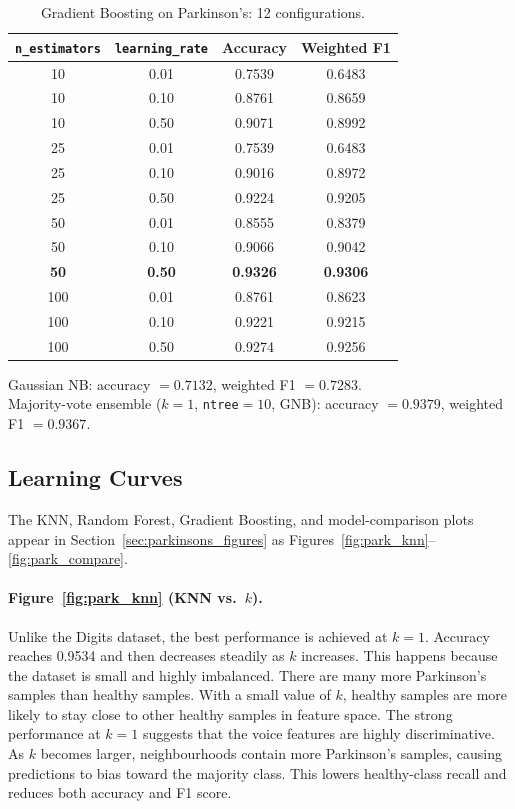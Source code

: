 \documentclass[11pt,letterpaper]{article}
\begin{document}
\begin{table}[H]
\centering
\caption{Gradient Boosting on Parkinson's: 12 configurations.}
\label{tab:d2_gb}
\begin{tabular}{@{}cccc@{}}
\toprule
\texttt{n\_estimators} & \texttt{learning\_rate}
  & Accuracy & Weighted F1 \\
\midrule
10  & 0.01 & 0.7539 & 0.6483 \\
10  & 0.10 & 0.8761 & 0.8659 \\
10  & 0.50 & 0.9071 & 0.8992 \\
25  & 0.01 & 0.7539 & 0.6483 \\
25  & 0.10 & 0.9016 & 0.8972 \\
25  & 0.50 & 0.9224 & 0.9205 \\
50  & 0.01 & 0.8555 & 0.8379 \\
50  & 0.10 & 0.9066 & 0.9042 \\
\rowcolor{hilight}
\textbf{50} & \textbf{0.50} & \textbf{0.9326} & \textbf{0.9306} \\
100 & 0.01 & 0.8761 & 0.8623 \\
100 & 0.10 & 0.9221 & 0.9215 \\
100 & 0.50 & 0.9274 & 0.9256 \\
\bottomrule
\end{tabular}
\end{table}

\noindent Gaussian NB:
accuracy $= 0.7132$, weighted F1 $= 0.7283$.\\
Majority-vote ensemble ($k=1$, \texttt{ntree}$=10$, GNB):
accuracy $= 0.9379$, weighted F1 $= 0.9367$.

\subsection{Learning Curves}

The KNN, Random Forest, Gradient Boosting, and model-comparison plots appear in Section~\ref{sec:parkinsons_figures} as Figures~\ref{fig:park_knn}--\ref{fig:park_compare}.

\paragraph{Figure~\ref{fig:park_knn} (KNN vs.\ $k$).}
Unlike the Digits dataset, the best performance is achieved at $k=1$.
Accuracy reaches 0.9534 and then decreases steadily as $k$ increases.
This happens because the dataset is small and highly imbalanced. There are
many more Parkinson's samples than healthy samples. With a small value of
$k$, healthy samples are more likely to stay close to other healthy samples
in feature space. The strong performance at $k=1$ suggests that the voice
features are highly discriminative. As $k$ becomes larger, neighbourhoods
contain more Parkinson's samples, causing predictions to bias toward the
majority class. This lowers healthy-class recall and reduces both accuracy
and F1 score.
\end{document}
